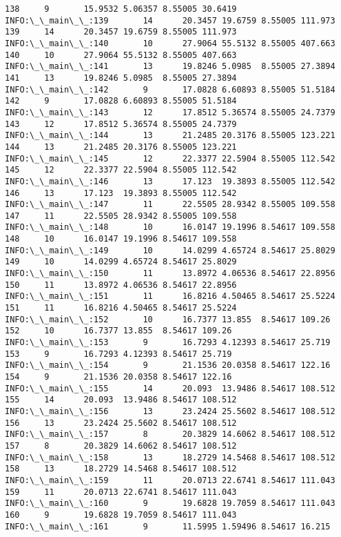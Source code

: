\documentclass[11pt]{article}
\begin{document}
\begin{Verbatim}[commandchars=\\\{\}]
138     9       15.9532 5.06357 8.55005 30.6419
INFO:\_\_main\_\_:139       14      20.3457 19.6759 8.55005 111.973
139     14      20.3457 19.6759 8.55005 111.973
INFO:\_\_main\_\_:140       10      27.9064 55.5132 8.55005 407.663
140     10      27.9064 55.5132 8.55005 407.663
INFO:\_\_main\_\_:141       13      19.8246 5.0985  8.55005 27.3894
141     13      19.8246 5.0985  8.55005 27.3894
INFO:\_\_main\_\_:142       9       17.0828 6.60893 8.55005 51.5184
142     9       17.0828 6.60893 8.55005 51.5184
INFO:\_\_main\_\_:143       12      17.8512 5.36574 8.55005 24.7379
143     12      17.8512 5.36574 8.55005 24.7379
INFO:\_\_main\_\_:144       13      21.2485 20.3176 8.55005 123.221
144     13      21.2485 20.3176 8.55005 123.221
INFO:\_\_main\_\_:145       12      22.3377 22.5904 8.55005 112.542
145     12      22.3377 22.5904 8.55005 112.542
INFO:\_\_main\_\_:146       13      17.123  19.3893 8.55005 112.542
146     13      17.123  19.3893 8.55005 112.542
INFO:\_\_main\_\_:147       11      22.5505 28.9342 8.55005 109.558
147     11      22.5505 28.9342 8.55005 109.558
INFO:\_\_main\_\_:148       10      16.0147 19.1996 8.54617 109.558
148     10      16.0147 19.1996 8.54617 109.558
INFO:\_\_main\_\_:149       10      14.0299 4.65724 8.54617 25.8029
149     10      14.0299 4.65724 8.54617 25.8029
INFO:\_\_main\_\_:150       11      13.8972 4.06536 8.54617 22.8956
150     11      13.8972 4.06536 8.54617 22.8956
INFO:\_\_main\_\_:151       11      16.8216 4.50465 8.54617 25.5224
151     11      16.8216 4.50465 8.54617 25.5224
INFO:\_\_main\_\_:152       10      16.7377 13.855  8.54617 109.26
152     10      16.7377 13.855  8.54617 109.26
INFO:\_\_main\_\_:153       9       16.7293 4.12393 8.54617 25.719
153     9       16.7293 4.12393 8.54617 25.719
INFO:\_\_main\_\_:154       9       21.1536 20.0358 8.54617 122.16
154     9       21.1536 20.0358 8.54617 122.16
INFO:\_\_main\_\_:155       14      20.093  13.9486 8.54617 108.512
155     14      20.093  13.9486 8.54617 108.512
INFO:\_\_main\_\_:156       13      23.2424 25.5602 8.54617 108.512
156     13      23.2424 25.5602 8.54617 108.512
INFO:\_\_main\_\_:157       8       20.3829 14.6062 8.54617 108.512
157     8       20.3829 14.6062 8.54617 108.512
INFO:\_\_main\_\_:158       13      18.2729 14.5468 8.54617 108.512
158     13      18.2729 14.5468 8.54617 108.512
INFO:\_\_main\_\_:159       11      20.0713 22.6741 8.54617 111.043
159     11      20.0713 22.6741 8.54617 111.043
INFO:\_\_main\_\_:160       9       19.6828 19.7059 8.54617 111.043
160     9       19.6828 19.7059 8.54617 111.043
INFO:\_\_main\_\_:161       9       11.5995 1.59496 8.54617 16.215

\end{Verbatim}
\end{document}

